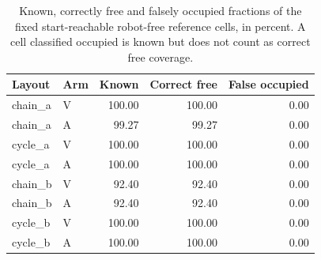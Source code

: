 \begin{table}[t]
\centering
\caption{Known, correctly free and falsely occupied fractions of the fixed start-reachable robot-free reference cells, in percent. A cell classified occupied is known but does not count as correct free coverage.}
\small\setlength{\tabcolsep}{4pt}
\begin{tabular}{llrrr}
\toprule
Layout & Arm & Known & Correct free & False occupied \\
\midrule
chain\_a & V & 100.00 & 100.00 & 0.00 \\
chain\_a & A & 99.27 & 99.27 & 0.00 \\
cycle\_a & V & 100.00 & 100.00 & 0.00 \\
cycle\_a & A & 100.00 & 100.00 & 0.00 \\
chain\_b & V & 92.40 & 92.40 & 0.00 \\
chain\_b & A & 92.40 & 92.40 & 0.00 \\
cycle\_b & V & 100.00 & 100.00 & 0.00 \\
cycle\_b & A & 100.00 & 100.00 & 0.00 \\
\bottomrule
\end{tabular}
\end{table}
